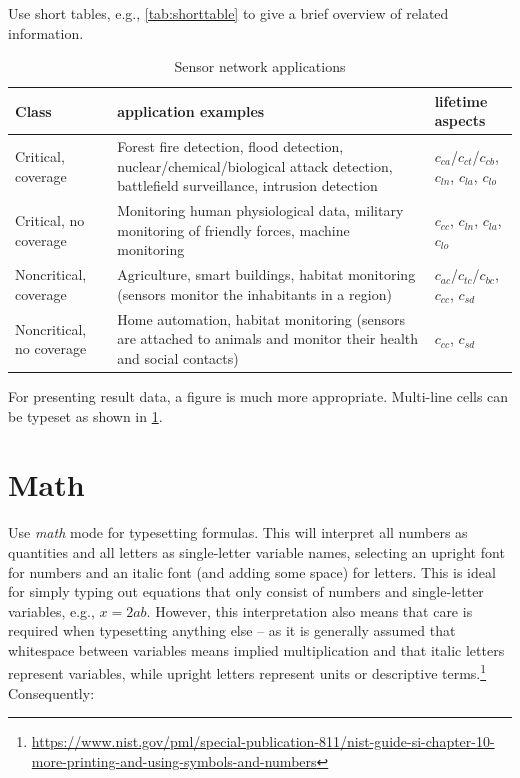 Use short tables, e.g., \cref{tab:shorttable} to give a brief overview of related information.

\begin{table}
    \centering
    \begin{tabular}{>{\raggedright}p{1.7cm}p{5.4cm}p{3.4cm}}
        \toprule
        Class & application examples & lifetime aspects \\
        \midrule
        Critical, coverage &
                Forest fire detection, flood detection, nuclear/chemical/biological attack detection, battlefield surveillance, intrusion detection &
                $c_{ca}$/$c_{ct}$/$c_{cb}$, $c_{ln}$, $c_{la}$, $c_{lo}$\\
        Critical, no coverage &
                Monitoring human physiological data, military monitoring of friendly forces, machine monitoring &
                $c_{cc}$, $c_{ln}$, $c_{la}$, $c_{lo}$ \\
        Noncritical, coverage &
                Agriculture, smart buildings, habitat monitoring (sensors monitor the inhabitants in a region) &
                $c_{ac}$/$c_{tc}$/$c_{bc}$, $c_{cc}$, $c_{sd}$ \\
        Noncritical, no coverage &
                Home automation, habitat monitoring (sensors are attached to animals and monitor their health and social contacts) &
                $c_{cc}$, $c_{sd}$ \\
        \bottomrule
    \end{tabular}
    \caption{Sensor network applications}
    \label{tab:SensorNetworkApplications}
\end{table}

For presenting result data, a figure is much more appropriate.
Multi-line cells can be typeset as shown in \cref{tab:SensorNetworkApplications}.

\clearpage
\section{Math}

Use \emph{math} mode for typesetting formulas.
This will interpret all numbers as quantities and all letters as single-letter variable names, selecting an upright font for numbers and an italic font (and adding some space) for letters.
This is ideal for simply typing out equations that only consist of numbers and single-letter variables, e.g., $x = 2ab$.
However, this interpretation also means that care is required when typesetting anything else -- as it is generally assumed that whitespace between variables means implied multiplication and that italic letters represent variables, while upright letters represent units or descriptive terms.\footnote{\url{https://www.nist.gov/pml/special-publication-811/nist-guide-si-chapter-10-more-printing-and-using-symbols-and-numbers}}
Consequently:

